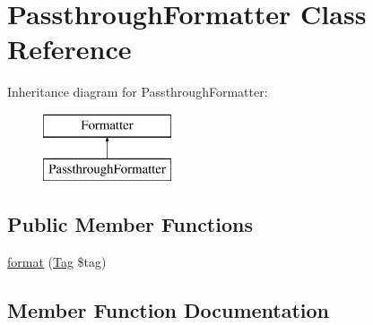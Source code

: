 \hypertarget{classphp_documentor_1_1_reflection_1_1_doc_block_1_1_tags_1_1_formatter_1_1_passthrough_formatter}{}\section{Passthrough\+Formatter Class Reference}
\label{classphp_documentor_1_1_reflection_1_1_doc_block_1_1_tags_1_1_formatter_1_1_passthrough_formatter}
Inheritance diagram for Passthrough\+Formatter\+:\begin{figure}[H]
\begin{center}
\leavevmode
\includegraphics[height=2.000000cm]{classphp_documentor_1_1_reflection_1_1_doc_block_1_1_tags_1_1_formatter_1_1_passthrough_formatter}
\end{center}
\end{figure}
\subsection*{Public Member Functions}
\begin{DoxyCompactItemize}
\item 
\mbox{\hyperlink{classphp_documentor_1_1_reflection_1_1_doc_block_1_1_tags_1_1_formatter_1_1_passthrough_formatter_a237fc645f9f13d476abbb368c53b64d0}{format}} (\mbox{\hyperlink{interfacephp_documentor_1_1_reflection_1_1_doc_block_1_1_tag}{Tag}} \$tag)
\end{DoxyCompactItemize}


\subsection{Member Function Documentation}
\mbox{\label{classphp_documentor_1_1_reflection_1_1_doc_block_1_1_tags_1_1_formatter_1_1_passthrough_formatter_a237fc645f9f13d476abbb368c53b64d0}} 
